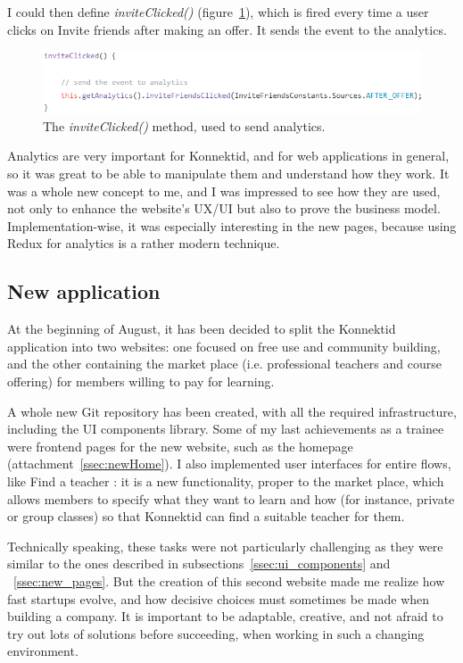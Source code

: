 I could then define \textit{inviteClicked()} ({\sc figure}~\ref{fig:inviteClicked}), which is fired every time a user clicks on Invite friends after making an offer. It sends the event to the analytics. 

\begin{figure}[H]
    \centering
    \includegraphics[scale=0.9]{figure/inviteClicked.png}
    \caption{The \textit{inviteClicked()} method, used to send analytics.}
    \label{fig:inviteClicked}
\end{figure}

Analytics are very important for Konnektid, and for web applications in general, so it was great to be able to manipulate them and understand how they work. It was a whole new concept to me, and I was impressed to see how they are used, not only to enhance the website's UX/UI but also to prove the business model. Implementation-wise, it was especially interesting in the new pages, because using Redux for analytics is a rather modern technique.

\subsection{New application}
\label{ssec:newApp}

At the beginning of August, it has been decided to split the Konnektid application into two websites: one focused on free use and community building, and the other containing the market place (i.e. professional teachers and course offering) for members willing to pay for learning. 

A whole new Git repository has been created, with all the required infrastructure, including the UI components library. Some of my last achievements as a trainee were frontend pages for the new website, such as the homepage ({\sc attachment}~\ref{ssec:newHome}). I also implemented user interfaces for entire flows, like \guillemotleft{} Find a teacher \guillemotright{}: it is a new functionality, proper to the market place, which allows members to specify what they want to learn and how (for instance, private or group classes) so that Konnektid can find a suitable teacher for them.

Technically speaking, these tasks were not particularly challenging as they were similar to the ones described in {\sc subsections}~\ref{ssec:ui_components} and ~\ref{ssec:new_pages}. But the creation of this second website made me realize how fast startups evolve, and how decisive choices must sometimes be made when building a company. It is important to be adaptable, creative, and not afraid to try out lots of solutions before succeeding, when working in such a changing environment.